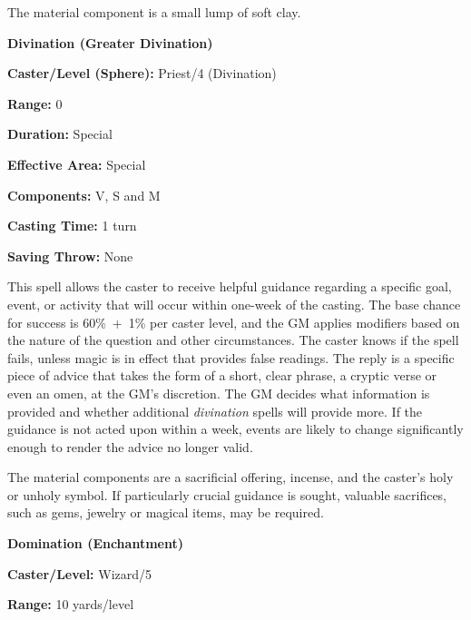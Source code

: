 \begin{multicols}{2}
The material component is a small lump of soft clay.

\vspace{1em}

\noindent
\begin{minipage}{\columnwidth}

\noindent \textbf{Divination (Greater Divination)}

\noindent \textbf{Caster/Level (Sphere):} Priest/4 (Divination)

\noindent \textbf{Range:} 0

\noindent \textbf{Duration:} Special

\noindent \textbf{Effective Area:} Special

\noindent \textbf{Components:} V, S and M

\noindent \textbf{Casting Time:} 1 turn

\noindent \textbf{Saving Throw:} None

\end{minipage}

This spell allows the caster to receive helpful guidance regarding a specific goal, event, or activity that will occur within one-week of the casting.  The base chance for success is 60\%~+~1\% per caster level, and the GM applies modifiers based on the nature of the question and other circumstances.  The caster knows if the spell fails, unless magic is in effect that provides false readings.  The reply is a specific piece of advice that takes the form of a short, clear phrase, a cryptic verse or even an omen, at the GM's discretion.  The GM decides what information is provided and whether additional \textit{divination} spells will provide more.  If the guidance is not acted upon within a week, events are likely to change significantly enough to render the advice no longer valid.

The material components are a sacrificial offering, incense, and the caster's holy or unholy symbol.  If particularly crucial guidance is sought, valuable sacrifices, such as gems, jewelry or magical items, may be required.

\vspace{1em}

\noindent
\begin{minipage}{\columnwidth}

\noindent \textbf{Domination (Enchantment)}

\noindent \textbf{Caster/Level:} Wizard/5

\noindent \textbf{Range:} 10 yards/level


\end{minipage}
\end{multicols}
